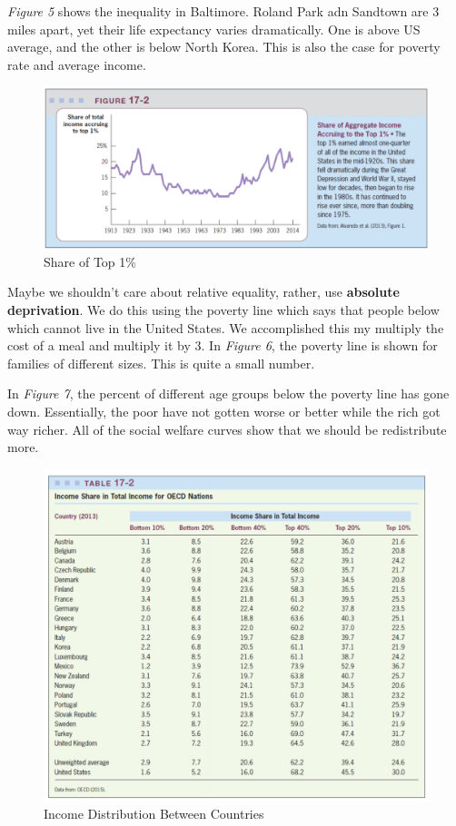\documentclass{article}
\begin{document}
\textit{Figure 5} shows the inequality in Baltimore. Roland Park adn Sandtown
are 3 miles apart, yet their life expectancy varies dramatically. One is above
US average, and the other is below North Korea. This is also the case for
poverty rate and average income. 

\begin{figure}[H]
    \centering
    \includegraphics[scale=0.45]{"Share of Top 1 Percent"}
    \caption{Share of Top 1\%}
\end{figure}

Maybe we shouldn't care about relative equality, rather, use \textbf{absolute
deprivation}. We do this using the poverty line which says that people below
which cannot live in the United States. We accomplished this my multiply the
cost of a meal and multiply it by 3. In \textit{Figure 6}, the poverty line is
shown for families of different sizes. This is quite a small number.

In \textit{Figure 7}, the percent of different age groups below the poverty line
has gone down. Essentially, the poor have not gotten worse or better while the
rich got way richer. All of the social welfare curves show that we should be
redistribute more.

\begin{figure}[H]
    \centering
    \includegraphics[scale=0.50]{"Income Distribution Between Countries"}
    \caption{Income Distribution Between Countries}
\end{figure}
\end{document}
